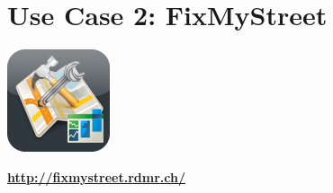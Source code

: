 \chapter{Use Case 2: FixMyStreet}
\label{fixmystreet}

\begin{center}
\includegraphics[scale=0.8]{images/usecase2-fixmystreet/fixmystreet-icon_with_gloss}

{\large \textbf{\url{http://fixmystreet.rdmr.ch/}}}

\vspace{1cm}


\end{center}
